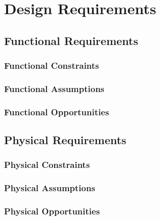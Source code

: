 \chapter{Design Requirements}

\section{Functional Requirements}

\subsection{Functional Constraints}
\subsection{Functional Assumptions}
\subsection{Functional Opportunities}

\section{Physical Requirements}
\subsection{Physical Constraints}
\subsection{Physical Assumptions}
\subsection{Physical Opportunities}